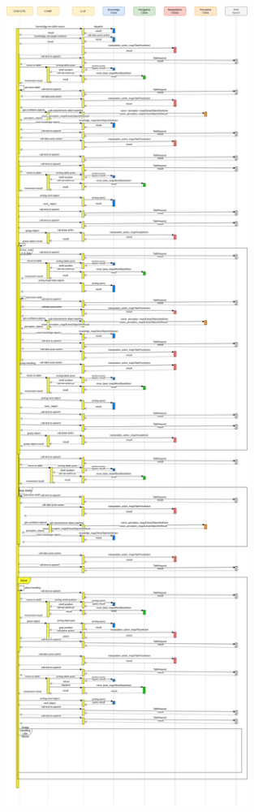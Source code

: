 \documentclass[main.tex]{subfiles}
\begin{document}
		\begin{figure}	
			\centering
			\includegraphics[width=0.7\textwidth]{pictures/diagramms/grocery-sequence .png}
			\caption{}
			\label{fig:grocery-sequence}
		\end{figure}
	
\end{document}
